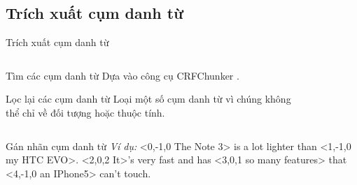 \documentclass[9pt,xcolor=table,hyperref=unicode]{beamer}
\begin{document}
	\subsection{Trích xuất cụm danh từ}
	\begin{frame}{Trích xuất cụm danh từ}		
		\begin{columns}[t]
			\begin{column}{0.4\textwidth}
			   	\begin{block}{Tìm các cụm danh từ}
	   				Dựa vào công cụ CRFChunker \footnotemark.
				\end{block}
				\begin{block}{Lọc lại các cụm danh từ}
			   		Loại một số cụm danh từ vì chúng không thể chỉ về đối tượng hoặc thuộc tính.				
				\end{block}
			\end{column}
			\begin{column}{0.6\textwidth}  %
			 	\begin{figure}[H]
					\LARGE 
					\centering				
					\resizebox{65mm}{!}{}	
				\end{figure}
			\end{column}
		\end{columns}
		\begin{columns}[t]
			\begin{column}{\textwidth}
			   	\begin{block}{Gán nhãn cụm danh từ}					
					\textit{Ví dụ:} <0,-1,0 The Note 3> is a lot lighter than <1,-1,0 my HTC EVO>. <2,0,2 It>'s very fast and has <3,0,1 so many features> that <4,-1,0 an IPhone5> can't touch. 
				\end{block}					
			\end{column}			
		\end{columns}
	\end{frame}
\end{document}
